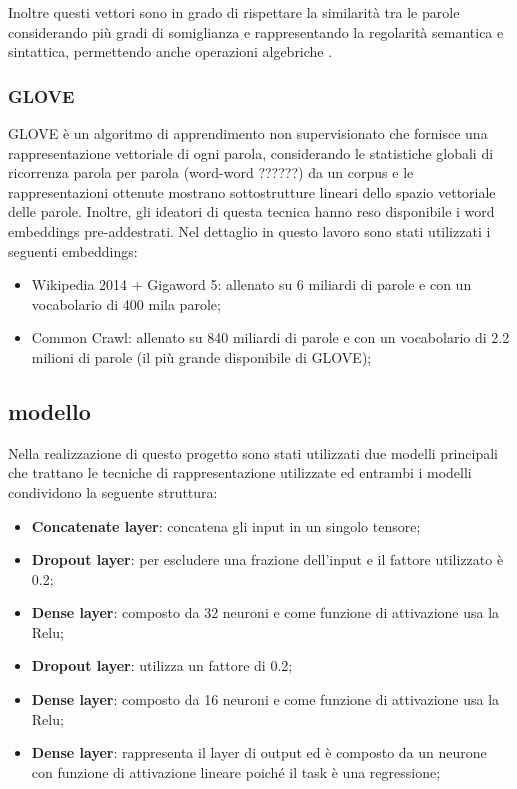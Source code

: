 Inoltre questi vettori sono in grado di rispettare la similarità tra le parole
considerando più gradi di somiglianza e rappresentando la regolarità semantica e
sintattica, permettendo anche operazioni algebriche \cite{mikolov2013efficient}.


\subsubsection{GLOVE}
GLOVE \cite{pennington2014glove} è un algoritmo di apprendimento non supervisionato che fornisce una rappresentazione vettoriale di ogni parola, considerando le statistiche globali di ricorrenza parola per parola (word-word ??????) da un corpus e le rappresentazioni ottenute mostrano sottostrutture lineari dello spazio vettoriale delle parole. Inoltre, gli ideatori di questa tecnica hanno reso disponibile i word embeddings pre-addestrati.
Nel dettaglio in questo lavoro sono stati utilizzati i seguenti embeddings:
\begin{itemize}
	\item Wikipedia 2014 + Gigaword 5: allenato su 6 miliardi di parole e con un vocabolario di 400 mila parole;
	\item Common Crawl: allenato su 840 miliardi di parole e con un vocabolario di 2.2 milioni di parole (il più grande disponibile di GLOVE);
\end{itemize}

\subsection{modello}\label{Modello}
Nella realizzazione di questo progetto sono stati utilizzati due modelli principali che trattano le tecniche di rappresentazione utilizzate ed  entrambi i modelli condividono la seguente struttura:
\begin{itemize}
	\item \textbf{Concatenate layer}: concatena gli input in un singolo tensore;
	\item \textbf{Dropout layer}: per escludere una frazione dell'input e il fattore utilizzato è 0.2;
	\item \textbf{Dense layer}: composto da 32 neuroni e come funzione di attivazione usa la Relu;
	\item \textbf{Dropout layer}: utilizza un fattore di 0.2;
	\item \textbf{Dense layer}: composto da 16 neuroni e come funzione di attivazione usa la Relu;
	\item \textbf{Dense layer}: rappresenta il layer di output ed è composto da un neurone con funzione di attivazione lineare poiché il task è una regressione;
\end{itemize}
